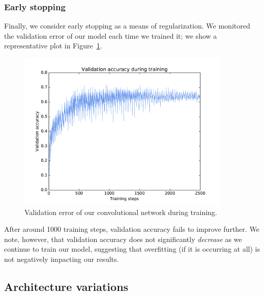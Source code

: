 \documentclass{article}
\begin{document}
\begin{multicols}{2}
\subsubsection{Early stopping}

Finally, we consider early stopping as a means of regularization.
We monitored the validation error
of our model each time we trained it;
we show a representative plot in Figure~\ref{fig:2-4-4-validation-acc}.

\begin{figure}[t]
   \centering
   \includegraphics[width=4in]{img/2-4-4-validation-acc-new.pdf}
   \caption{Validation error of our convolutional network during training.}
   \label{fig:2-4-4-validation-acc}
\end{figure}

After around 1000 training steps,
validation accuracy fails to improve further.
We note, however, that validation accuracy
does not significantly \emph{decrease}
as we continue to train our model,
suggesting that overfitting (if it is occurring at all)
is not negatively impacting our results.



\subsection{Architecture variations}




\end{multicols}
\end{document}
